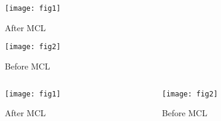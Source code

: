 \documentclass{beamer}
\theoremstyle{theorem}
\theoremstyle{definition}
\begin{document}
\begin{frame}
\begin{center}
\begin{figure}
\texttt{[image: fig1]}
\caption{After MCL}
\end{figure}
\begin{figure}
\texttt{[image: fig2]}
\caption{Before MCL}
\end{figure}
\end{center}
\end{frame}

\begin{frame}
\begin{columns}

\begin{column}{0.5\textwidth}
    \begin{center}
        \begin{figure}
        \texttt{[image: fig1]}
        \caption{After MCL}
        \end{figure}
    \end{center}
\end{column}

\begin{column}{0.5\textwidth}
    \begin{center}
        \begin{figure}
        \texttt{[image: fig2]}
        \caption{Before MCL}
        \end{figure}
    \end{center}
\end{column}

\end{columns}
\end{frame}
\fi

\end{document}
